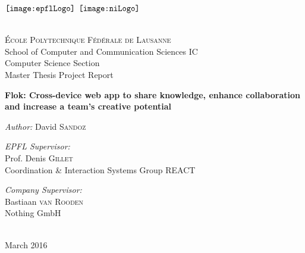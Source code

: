 
\begin{titlepage}

\begin{center}

\begin{minipage}{6in}
  \centering
  $\vcenter{\hbox{\texttt{[image: \\epflLogo]}}}$
  \hspace*{2cm}
  $\vcenter{\hbox{\texttt{[image: \\niLogo]}}}$
\end{minipage}\\[2 cm]

{\Large \textsc{École Polytechnique Fédérale de Lausanne}}\\[0.5cm]
{\large School of Computer and Communication Sciences IC}\\[0.5cm]
{\large Computer Science Section}\\[0.5cm]
{\LARGE Master Thesis Project Report}\\[0.5cm]

\vspace{1cm}

{\huge \bfseries Flok: Cross-device web app to share knowledge, enhance collaboration and increase a team's creative potential}\\[0.4cm]

\vspace{1.5cm}

\large \emph{Author:} David \textsc{Sandoz}\\[1.5cm]

\begin{minipage}{0.5\textwidth}
\begin{flushleft} \large
\emph{EPFL Supervisor:}\\
Prof. Denis \textsc{Gillet}\\
Coordination \& Interaction Systems Group REACT
\end{flushleft}
\end{minipage}
\begin{minipage}{0.4\textwidth}
\begin{flushright} \large
\emph{Company Supervisor:}\\
Bastiaan \textsc{van Rooden}\\
Nothing GmbH\\
~
\end{flushright}
\end{minipage}

\vfill

{\large March 2016}

\end{center}

\end{titlepage}
